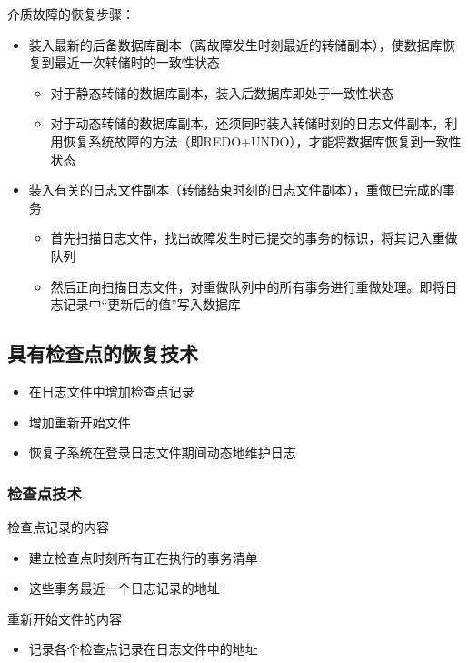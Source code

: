 介质故障的恢复步骤：
\begin{itemize}
    \item 装入最新的后备数据库副本（离故障发生时刻最近的转储副本），使数据库恢复到最近一次转储时的一致性状态
    \begin{itemize}
        \item 对于静态转储的数据库副本，装入后数据库即处于一致性状态
        \item 对于动态转储的数据库副本，还须同时装入转储时刻的日志文件副本，利用恢复系统故障的方法（即REDO+UNDO），才能将数据库恢复到一致性状态
    \end{itemize}
    \item 装入有关的日志文件副本（转储结束时刻的日志文件副本），重做已完成的事务
    \begin{itemize}
        \item 首先扫描日志文件，找出故障发生时已提交的事务的标识，将其记入重做队列
        \item 然后正向扫描日志文件，对重做队列中的所有事务进行重做处理。即将日志记录中“更新后的值”写入数据库
    \end{itemize}
\end{itemize}

\subsection{具有检查点的恢复技术}
\begin{itemize}
    \item 在日志文件中增加检查点记录
    \item 增加重新开始文件
    \item 恢复子系统在登录日志文件期间动态地维护日志
\end{itemize}

\subsubsection{检查点技术}
检查点记录的内容
\begin{itemize}
    \item 建立检查点时刻所有正在执行的事务清单
    \item 这些事务最近一个日志记录的地址
\end{itemize}

重新开始文件的内容
\begin{itemize}
    \item 记录各个检查点记录在日志文件中的地址
\end{itemize}

